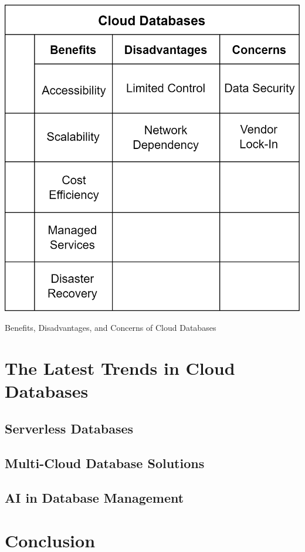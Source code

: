 \documentclass[12pt, a4paper]{article}
\begin{document}
    
    \begin{table}[t]
        \centering
        \includegraphics[width=0.65\linewidth]{images/benefits.png}
        \caption{Benefits, Disadvantages, and Concerns of Cloud Databases}
        \label{tab:benefits}
    \end{table}
\clearpage

\section{The Latest Trends in Cloud Databases}
    \subsection{Serverless Databases}
    \subsection{Multi-Cloud Database Solutions}
    \subsection{AI in Database Management}
\clearpage

\section{Conclusion}
\clearpage

\section*{}


\end{document}
